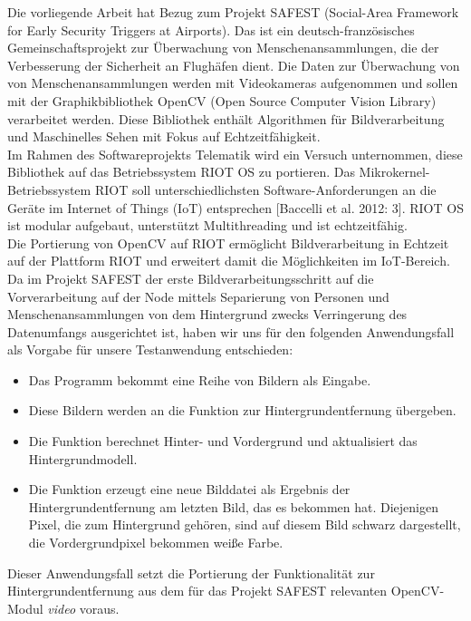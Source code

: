 \documentclass[10pt,a4paper]{article}
\begin{document}
Die vorliegende Arbeit hat Bezug zum Projekt SAFEST (Social-Area Framework for Early Security Triggers at Airports). Das ist ein deutsch-französisches Gemeinschaftsprojekt zur Überwachung von Menschenansammlungen, die der Verbesserung der Sicherheit an Flughäfen dient. Die Daten zur Überwachung von von Menschenansammlungen werden mit Videokameras aufgenommen und sollen mit der Graphikbibliothek OpenCV (Open Source Computer Vision Library) verarbeitet werden. Diese Bibliothek enthält Algorithmen für Bildverarbeitung und Maschinelles Sehen mit Fokus auf Echtzeitfähigkeit. \\

Im Rahmen des Softwareprojekts Telematik wird ein Versuch unternommen, diese Bibliothek auf das Betriebssystem RIOT OS zu portieren. Das Mikrokernel-Betriebssystem RIOT soll unterschiedlichsten Software-Anforderungen an die Geräte im Internet of Things (IoT) entsprechen [Baccelli et al. 2012: 3]. RIOT OS ist modular aufgebaut, unterstützt Multithreading und ist echtzeitfähig. \\

Die Portierung von OpenCV auf RIOT ermöglicht Bildverarbeitung in Echtzeit auf der Plattform RIOT und erweitert damit die Möglichkeiten im IoT-Bereich. \\

Da im Projekt SAFEST der erste Bildverarbeitungsschritt auf die Vorverarbeitung auf der Node mittels Separierung von Personen und Menschenansammlungen von dem Hintergrund zwecks Verringerung des Datenumfangs ausgerichtet ist, haben wir uns für den folgenden Anwendungsfall als Vorgabe für unsere Testanwendung entschieden: 

\begin{itemize}
\item Das Programm bekommt eine Reihe von Bildern als Eingabe.
\item Diese Bildern werden an die Funktion zur Hintergrundentfernung übergeben. 
\item Die Funktion berechnet Hinter- und Vordergrund und aktualisiert das Hintergrundmodell.
\item Die Funktion erzeugt eine neue Bilddatei als Ergebnis der Hintergrundentfernung am letzten Bild, das es bekommen hat. Diejenigen Pixel, die zum Hintergrund gehören, sind auf diesem Bild schwarz dargestellt, die Vordergrundpixel bekommen weiße Farbe.
\end{itemize}

Dieser Anwendungsfall setzt die Portierung der Funktionalität zur Hintergrundentfernung aus dem für das Projekt SAFEST relevanten OpenCV-Modul {\it video} voraus.
\end{document}
